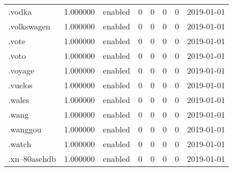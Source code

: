 \begin{tabular}{lrlrrrrl}
.vodka                    &          1.000000 &         enabled &                           0 &                           0 &                           0 &                   0 &           2019-01-01 \\
.volkswagen               &          1.000000 &         enabled &                           0 &                           0 &                           0 &                   0 &           2019-01-01 \\
.vote                     &          1.000000 &         enabled &                           0 &                           0 &                           0 &                   0 &           2019-01-01 \\
.voto                     &          1.000000 &         enabled &                           0 &                           0 &                           0 &                   0 &           2019-01-01 \\
.voyage                   &          1.000000 &         enabled &                           0 &                           0 &                           0 &                   0 &           2019-01-01 \\
.vuelos                   &          1.000000 &         enabled &                           0 &                           0 &                           0 &                   0 &           2019-01-01 \\
.wales                    &          1.000000 &         enabled &                           0 &                           0 &                           0 &                   0 &           2019-01-01 \\
.wang                     &          1.000000 &         enabled &                           0 &                           0 &                           0 &                   0 &           2019-01-01 \\
.wanggou                  &          1.000000 &         enabled &                           0 &                           0 &                           0 &                   0 &           2019-01-01 \\
.watch                    &          1.000000 &         enabled &                           0 &                           0 &                           0 &                   0 &           2019-01-01 \\
.xn--80asehdb             &          1.000000 &         enabled &                           0 &                           0 &                           0 &                   0 &           2019-01-01 \\

\end{tabular}
